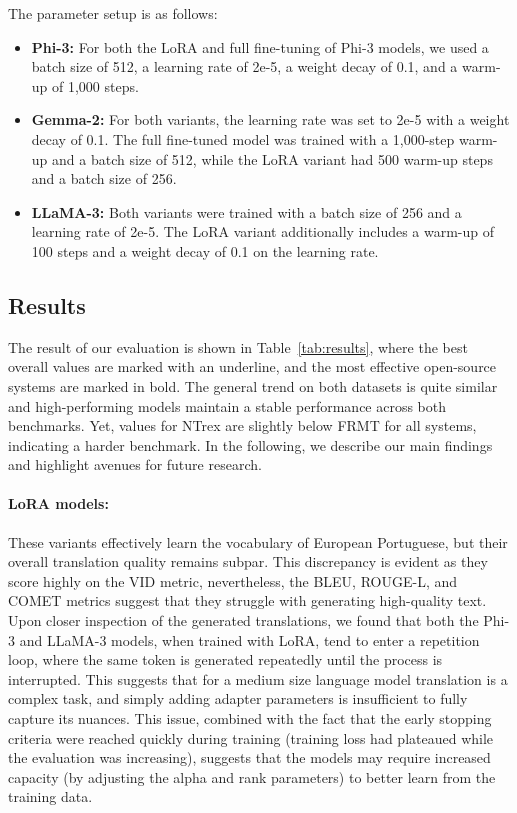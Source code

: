 The parameter setup is as follows:

\begin{itemize}
    \item \textbf{Phi-3:} For both the LoRA and full fine-tuning of Phi-3 models, we used a batch size of 512, a learning rate of 2e-5, a weight decay of 0.1, and a warm-up of 1,000 steps.
    \item \textbf{Gemma-2:} For both variants, the learning rate was set to 2e-5 with a weight decay of 0.1. The full fine-tuned model was trained with a 1,000-step warm-up and a batch size of 512, while the LoRA variant had 500 warm-up steps and a batch size of 256.
    \item \textbf{LLaMA-3:} Both variants were trained with a batch size of 256 and a learning rate of 2e-5. The LoRA variant additionally includes a warm-up of 100 steps and a weight decay of 0.1 on the learning rate.
\end{itemize}

\subsection{Results}
\label{sec:results}

%

The result of our evaluation is shown in Table~\ref{tab:results}, where the best overall values are marked with an underline, and the most effective open-source systems are marked in bold. 
The general trend on both datasets is quite similar and high-performing models maintain a stable performance across both benchmarks. 
Yet, values for NTrex are slightly below FRMT for all systems, indicating a harder benchmark.
In the following, we describe our main findings and highlight avenues for future research.

\paragraph{LoRA models:} These variants effectively learn the vocabulary of European Portuguese, but their overall translation quality remains subpar. 
This discrepancy is evident as they score highly on the VID metric, nevertheless, the BLEU, ROUGE-L, and COMET metrics suggest that they struggle with generating high-quality text. 
Upon closer inspection of the generated translations, we found that both the Phi-3 and LLaMA-3 models, when trained with LoRA, tend to enter a repetition loop, where the same token is generated repeatedly until the process is interrupted. 
This suggests that for a medium size language model translation is a complex task, and simply adding adapter parameters is insufficient to fully capture its nuances. 
This issue, combined with the fact that the early stopping criteria were reached quickly during training (training loss had plateaued while the evaluation was increasing), suggests that the models may require increased capacity (by adjusting the alpha and rank parameters) to better learn from the training data.

